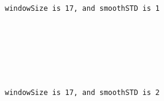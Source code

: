 \documentclass[11pt]{article}
\begin{document}
    \begin{center}
    \end{center}
    { \hspace*{\fill} \\}
    
    \begin{center}
    \end{center}
    { \hspace*{\fill} \\}
    
    \begin{Verbatim}[commandchars=\\\{\}]


windowSize is 17, and smoothSTD is 1

    \end{Verbatim}

    \begin{center}
    \end{center}
    { \hspace*{\fill} \\}
    
    \begin{center}
    \end{center}
    { \hspace*{\fill} \\}
    
    \begin{Verbatim}[commandchars=\\\{\}]


windowSize is 17, and smoothSTD is 2

    \end{Verbatim}

    \begin{center}
    \end{center}
    { \hspace*{\fill} \\}
    
    \begin{center}
    \end{center}
    { \hspace*{\fill} \\}
    
\end{document}
